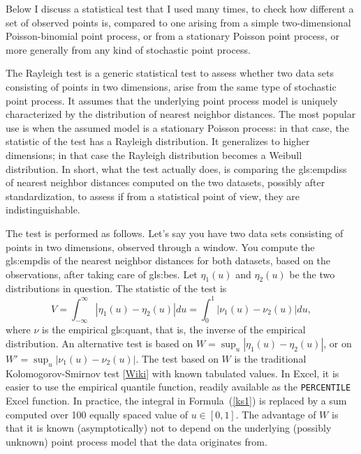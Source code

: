 \documentclass[10pt]{article}
\begin{document}
\noindent Below I discuss a statistical test that I used many times, to check how different a set of observed points is, compared to one arising from a simple two-dimensional Poisson-binomial point process, or from a stationary Poisson point process, or more generally from any kind of stochastic point process. \\


\noindent The \textcolor{index}{Rayleigh test} is a generic statistical test to assess whether two data sets consisting of points in two dimensions, arise from the same type of stochastic point process. It assumes that the underlying point process model is uniquely characterized by the distribution of nearest neighbor distances. The most popular use is when the assumed model is a stationary Poisson process: in that case, the statistic of the test has a 
\textcolor{index}{Rayleigh distribution}.
It generalizes to higher dimensions; in that case the Rayleigh distribution becomes a 
\textcolor{index}{Weibull distribution}. In short, what the test actually does, is comparing the 
 \glspl{gls:empdis} of nearest neighbor distances computed on the two datasets, 
possibly after \textcolor{index}{standardization}, to assess if from a statistical
point of view, they are indistinguishable. 

The test is performed as follows. Let's say you have two data sets consisting of points in two dimensions, observed through a window. You compute the
 \gls{gls:empdis} of the nearest neighbor distances for both datasets, based on the observations, after taking care of \glspl{gls:be}. Let $\eta_1(u)$ and
$\eta_2(u)$ be the two distributions in question. The statistic of the test is
\begin{equation}
V=\int_{-\infty}^\infty |\eta_1(u) - \eta_2(u)| du = \int_{0}^1 |\nu_1(u) - \nu_2(u)| du, \label{ks1}
\end{equation}
where $\nu$ is the empirical \gls{gls:quant}, that is, the inverse of the empirical distribution. An alternative test is based on
$W=\sup_u |\eta_1(u) - \eta_2(u)|$, or on $W'=\sup_u |\nu_1(u) - \nu_2(u)|$. The test based on $W$ is the traditional Kolomogorov-Smirnov test 
[\href{https://en.wikipedia.org/wiki/Kolmogorov-Smirnov_test}{Wiki}] with known tabulated values. In Excel, it is easier to use the empirical quantile function,
readily available as the \texttt{PERCENTILE} Excel function. In practice, the integral in Formula~(\ref{ks1}) is replaced by a sum computed over 100 equally spaced value of $u\in [0,1]$. The advantage of $W$ is that it is known (asymptotically) not to depend on the underlying (possibly unknown) point process model that the data originates from.
\end{document}
